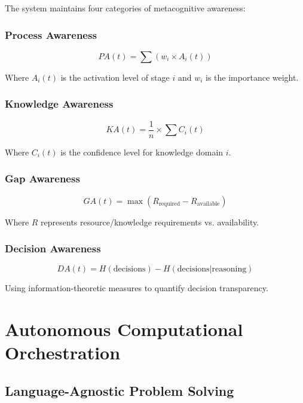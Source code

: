 \documentclass[11pt,a4paper]{article}
\begin{document}
The system maintains four categories of metacognitive awareness:

\subsubsection{Process Awareness}

\begin{equation}
PA(t) = \sum(w_i \times A_i(t))
\end{equation}

Where $A_i(t)$ is the activation level of stage $i$ and $w_i$ is the importance weight.

\subsubsection{Knowledge Awareness}

\begin{equation}
KA(t) = \frac{1}{n} \times \sum C_i(t)
\end{equation}

Where $C_i(t)$ is the confidence level for knowledge domain $i$.

\subsubsection{Gap Awareness}

\begin{equation}
GA(t) = \max(R_{\text{required}} - R_{\text{available}})
\end{equation}

Where $R$ represents resource/knowledge requirements vs. availability.

\subsubsection{Decision Awareness}

\begin{equation}
DA(t) = H(\text{decisions}) - H(\text{decisions} | \text{reasoning})
\end{equation}

Using information-theoretic measures to quantify decision transparency.

\section{Autonomous Computational Orchestration}

\subsection{Language-Agnostic Problem Solving}
\end{document}
